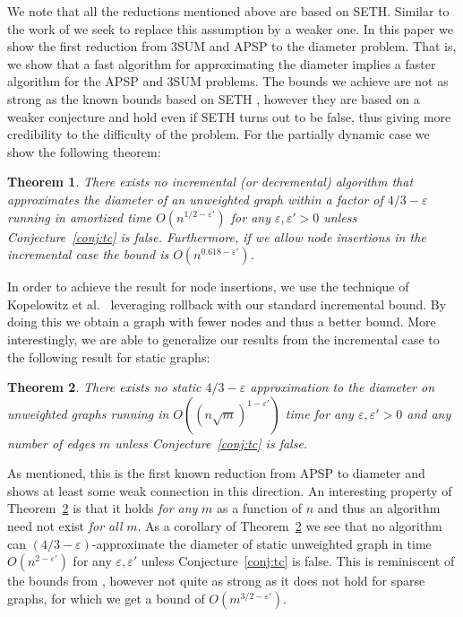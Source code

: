 \documentclass[a4paper,11pt]{article}
\newcommand{\eps}{\varepsilon}
\newtheorem{theorem}{Theorem}
\theoremstyle{definition}
\begin{document}
We note that all the reductions mentioned above are based on SETH. Similar to
the work of \cite{AbboudVY15,AbboudHVW16} we seek to replace this assumption by
a weaker one. In this paper we show the first reduction from 3SUM and APSP to
the diameter problem. That is, we show that a fast algorithm for approximating
the diameter implies a faster algorithm for the APSP and 3SUM
problems. The bounds we achieve are not as strong as the known bounds based on
SETH \cite{RodittyW13,ChechikLRSTW14,CairoGR16}, however they are based on a
weaker conjecture and hold even if SETH turns out to be false, thus giving more
credibility to the difficulty of the problem. For the partially dynamic case we
show the following theorem:
\begin{theorem}\label{thm:dyn_diam}
    There exists no incremental (or decremental) algorithm that approximates
    the diameter of an unweighted graph within a factor of $4/3-\eps$ running
    in amortized time $O(n^{1/2-\eps'})$ for any $\eps,\eps' > 0$ unless
    Conjecture~\ref{conj:tc} is false. Furthermore, if we allow node insertions
    in the incremental case the bound is $O(n^{0.618-\eps'})$.
\end{theorem}
In order to achieve the result for node insertions, we use the technique of
Kopelowitz et al.~\cite{KopelowitzPP16} leveraging rollback with our standard
incremental bound. By doing this we obtain a graph with fewer nodes
and thus a better bound.
More interestingly, we are able to generalize our results from the incremental
case to the following result for static graphs:
\begin{theorem}\label{thm:sta_diam}
    There exists no static $4/3-\eps$ approximation to the diameter on
    unweighted graphs running in $O((n\sqrt{m})^{1-\eps'})$ time for
    any $\eps,\eps' > 0$ and any number of edges $m$ unless
    Conjecture~\ref{conj:tc} is false.
\end{theorem}
As mentioned, this is the first known reduction from APSP to diameter and shows
at least some weak connection in this direction. An interesting property of
Theorem~\ref{thm:sta_diam} is that it holds \emph{for any} $m$ as a function of
$n$ and thus an algorithm need not exist \emph{for all} $m$.
As a corollary of Theorem~\ref{thm:sta_diam} we see that no algorithm can
$(4/3-\eps)$-approximate the diameter of static unweighted graph in time
$O(n^{2-\eps'})$ for any $\eps,\eps'$ unless Conjecture~\ref{conj:tc} is false.
This is reminiscent of the bounds from
\cite{RodittyW13,ChechikLRSTW14,CairoGR16}, however not quite as strong as it
does not hold for sparse graphs, for which we get a bound of $O(m^{3/2-\eps'})$.
\end{document}
